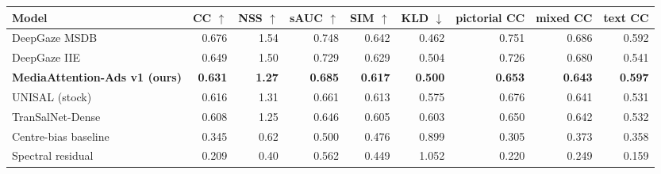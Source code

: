 \begin{tabular}{lrrrrrrrr}
\toprule
Model & CC $\uparrow$ & NSS $\uparrow$ & sAUC $\uparrow$ & SIM $\uparrow$ & KLD $\downarrow$ & pictorial CC & mixed CC & text CC \\
\midrule
DeepGaze MSDB & 0.676 & 1.54 & 0.748 & 0.642 & 0.462 & 0.751 & 0.686 & 0.592 \\
DeepGaze IIE & 0.649 & 1.50 & 0.729 & 0.629 & 0.504 & 0.726 & 0.680 & 0.541 \\
\textbf{MediaAttention-Ads v1 (ours)} & \textbf{0.631} & \textbf{1.27} & \textbf{0.685} & \textbf{0.617} & \textbf{0.500} & \textbf{0.653} & \textbf{0.643} & \textbf{0.597} \\
UNISAL (stock) & 0.616 & 1.31 & 0.661 & 0.613 & 0.575 & 0.676 & 0.641 & 0.531 \\
TranSalNet-Dense & 0.608 & 1.25 & 0.646 & 0.605 & 0.603 & 0.650 & 0.642 & 0.532 \\
Centre-bias baseline & 0.345 & 0.62 & 0.500 & 0.476 & 0.899 & 0.305 & 0.373 & 0.358 \\
Spectral residual & 0.209 & 0.40 & 0.562 & 0.449 & 1.052 & 0.220 & 0.249 & 0.159 \\
\bottomrule
\end{tabular}
